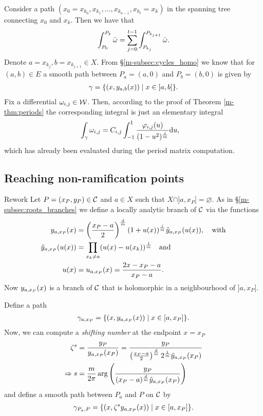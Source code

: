 \documentclass[main.tex]{subfiles}
\begin{document}
  Consider a path $(x_0=x_{k_0},x_{k_1},\dots,x_{k_{n-1}},x_{k_t}=x_k)$ in the spanning tree connecting $x_0$ and $x_k$. Then we have that
  \begin{align}
    \int_{P_0}^{P_k} \bar{\omega} = \sum_{j = 0}^{t-1}  \int_{P_{k_j}}^{P_{k_{j+1}}} \bar{\omega}.
  \end{align}
  Denote $a = x_{k_j}, b = x_{k_{j+1}} \in X$. From \S \ref{m-subsec:cycles_homo} we know that for $(a,b) \in E$ a smooth path between $P_a=(a,0)$ and $P_b=(b,0)$ is given by
  \begin{align*}
   \gamma = \{  (x,y_{a,b}(x))  \mid  x \in [a,b]  \}.
  \end{align*}
  Fix a differential $\omega_{i,j} \in \mathcal{W}$. Then, according to the proof of Theorem \ref{m-thm:periods} the corresponding integral is just an elementary integral
  \begin{align}
   \int_{\gamma} \omega_{i,j}  & =  C_{i,j}  \int_{-1}^1 \frac{\varphi_{i,j}(u)}{(1-u^2)^{\frac{j}{m}}} \mathrm d u,
  \end{align}
  which has already been evaluated during the period matrix computation.


  \subsection{Reaching non-ramification points}\label{subsec:ajm_finite}

   \todo Rework
   Let $P = (x_P,y_P) \in \mathcal{C}$ and $a \in X$ such that $X\cap]a,x_P]=\varnothing$. As in \S \ref{m-subsec:roots_branches} we define a locally analytic branch of $\mathcal{C}$ via the functions
  \begin{align}\label{def:yax}
  \begin{split}
   y_{a,x_P}(x)  & =  \left(\frac{x_P-a}{2}\right)^{\frac{d}{m}}  (1 + u(x))^{\frac{j}{m}}  \tilde{y}_{a,x_P}(u(x)), \quad \text{with} \\
   \tilde{y}_{a,x_P}(u(x))  & =  \prod_{x_k \ne a} (u(x) - u(x_k))^{\frac{1}{m}} \quad \text{and} \\
   u(x) & =  u_{a,x_P}(x) = \frac{2x-x_P-a}{x_P-a}.
   \end{split}
  \end{align}
  Now $y_{a,x_P}(x)$ is a branch of $\mathcal{C}$ that is holomorphic in a neighbourhood of $]a,x_P]$.

  Define a path
  \begin{align*}
   \gamma_{a,x_P} = \{  (x,y_{a,x_P}(x))  \mid  x \in [a,x_P]  \}.
  \end{align*}
  Now, we can compute a \emph{shifting number} at the endpoint $x=x_P$
  \begin{align*}
   \zeta^s & = \frac{y_P}{y_{a,x_P}(x_P)} = \frac{y_P}{\left(\frac{x_P-a}{2}\right)^{\frac{d}{m}} 2^{\frac{1}{m}} \tilde{y}_{a,x_P}(x_P)} \\
   \Rightarrow s & = \frac{m}{2\pi} \arg\left(  \frac{y_P}{ (x_P-a)^{\frac{d}{m}} \tilde{y}_{a,x_P}(x_P)} \right)
  \end{align*}
  and define a smooth path between $P_a$ and $P$ on $\mathcal{C}$ by
  \begin{align*}
   \gamma_{P_a,P} = \{  (x, \zeta^s y_{a,x_P}(x))  \mid  x \in [a,x_P]  \}.
  \end{align*}
\end{document}
